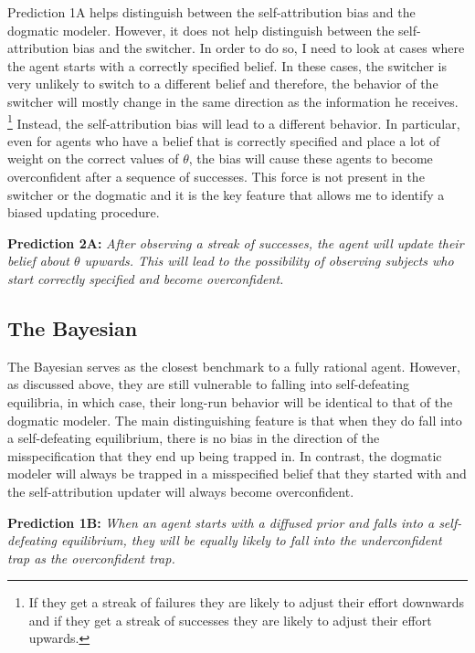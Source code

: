 \documentclass[
  12pt,
]{article}
\begin{document}
Prediction 1A helps distinguish between the self-attribution bias and
the dogmatic modeler. However, it does not help distinguish between the
self-attribution bias and the switcher. In order to do so, I need to
look at cases where the agent starts with a correctly specified belief.
In these cases, the switcher is very unlikely to switch to a different
belief and therefore, the behavior of the switcher will mostly change in
the same direction as the information he receives.
\footnote{If they get a streak of failures they are likely to 
adjust their effort downwards and if they get a streak of successes they are likely to adjust their effort upwards.}
Instead, the self-attribution bias will lead to a different behavior. In
particular, even for agents who have a belief that is correctly
specified and place a lot of weight on the correct values of \(\theta\),
the bias will cause these agents to become overconfident after a
sequence of successes. This force is not present in the switcher or the
dogmatic and it is the key feature that allows me to identify a biased
updating procedure.

\textbf{Prediction 2A:} \emph{After observing a streak of successes, the
agent will update their belief about \(\theta\) upwards. This will lead
to the possibility of observing subjects who start correctly specified
and become overconfident.}

\hypertarget{the-bayesian-1}{%
\subsection{The Bayesian}\label{the-bayesian-1}}

The Bayesian serves as the closest benchmark to a fully rational agent.
However, as discussed above, they are still vulnerable to falling into
self-defeating equilibria, in which case, their long-run behavior will
be identical to that of the dogmatic modeler. The main distinguishing
feature is that when they do fall into a self-defeating equilibrium,
there is no bias in the direction of the misspecification that they end
up being trapped in. In contrast, the dogmatic modeler will always be
trapped in a misspecified belief that they started with and the
self-attribution updater will always become overconfident.

\textbf{Prediction 1B:} \emph{When an agent starts with a diffused prior
and falls into a self-defeating equilibrium, they will be equally likely
to fall into the underconfident trap as the overconfident trap.}
\end{document}
